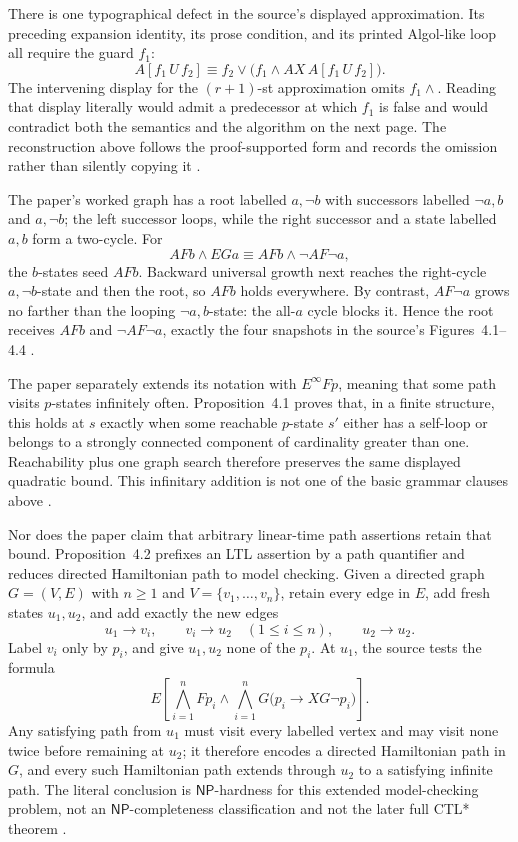 There is one typographical defect in the source's displayed approximation.
Its preceding expansion identity, its prose condition, and its printed
Algol-like loop all require the guard \(f_1\):
\[
 A[f_1\,U\,f_2]
 \equiv
 f_2\lor\bigl(f_1\land AX\,A[f_1\,U\,f_2]\bigr).
\]
The intervening display for the \((r+1)\)-st approximation omits
\(f_1\land\).  Reading that display literally would admit a predecessor at
which \(f_1\) is false and would contradict both the semantics and the
algorithm on the next page.  The reconstruction above follows the
proof-supported form and records the omission rather than silently copying it
\cite[pp.~56--57]{ClarkeEmerson1981}.

The paper's worked graph has a root labelled \(a,\neg b\) with successors
labelled \(\neg a,b\) and \(a,\neg b\); the left successor loops, while the
right successor and a state labelled \(a,b\) form a two-cycle.  For
\[
 AFb\land EGa
 \equiv AFb\land\neg AF\neg a,
\]
the \(b\)-states seed \(AFb\).  Backward universal growth next reaches the
right-cycle \(a,\neg b\)-state and then the root, so \(AFb\) holds
everywhere.  By contrast, \(AF\neg a\) grows no farther than the looping
\(\neg a,b\)-state: the all-\(a\) cycle blocks it.  Hence the root receives
\(AFb\) and \(\neg AF\neg a\), exactly the four snapshots in the source's
Figures~4.1--4.4 \cite[pp.~57--58]{ClarkeEmerson1981}.

The paper separately extends its notation with \(E^{\infty}Fp\), meaning
that some path visits \(p\)-states infinitely often.  Proposition~4.1 proves
that, in a finite structure, this holds at \(s\) exactly when some reachable
\(p\)-state \(s'\) either has a self-loop or belongs to a strongly connected
component of cardinality greater than one.  Reachability plus one graph
search therefore preserves the same displayed quadratic bound.  This
infinitary addition is not one of the basic grammar clauses above
\cite[pp.~57--59]{ClarkeEmerson1981}.

Nor does the paper claim that arbitrary linear-time path assertions retain
that bound.  Proposition~4.2 prefixes an LTL assertion by a path quantifier
and reduces directed Hamiltonian path to model checking.  Given a directed
graph \(G=(V,E)\) with \(n\geq1\) and
\(V=\{v_1,\ldots,v_n\}\), retain every edge in \(E\), add fresh states
\(u_1,u_2\), and add exactly the new edges
\[
 u_1\to v_i,\qquad v_i\to u_2\quad(1\leq i\leq n),
 \qquad u_2\to u_2.
\]
Label \(v_i\) only by \(p_i\), and give \(u_1,u_2\) none of the \(p_i\).
At \(u_1\), the source tests the formula
\[
 E\left[
   \bigwedge_{i=1}^{n}Fp_i
   \land
   \bigwedge_{i=1}^{n}G\bigl(p_i\to XG\neg p_i\bigr)
 \right].
\]
Any satisfying path from \(u_1\) must visit every labelled vertex and may
visit none twice before remaining at \(u_2\); it therefore encodes a directed
Hamiltonian path in \(G\), and every such Hamiltonian path extends through
\(u_2\) to a satisfying infinite path.  The literal conclusion is
\(\mathsf{NP}\)-hardness
for this extended model-checking problem, not an \(\mathsf{NP}\)-completeness
classification and not the later full CTL* theorem
\cite[pp.~59--60]{ClarkeEmerson1981}.

